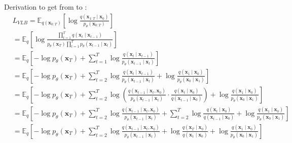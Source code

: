 \noindent Derivation to get from  to :
\begingroup
\small
\begin{subequations}
	\label{eqn:vlb3_appendix}
	\begin{align}
	& L_{VLB}=\mathbb{E}_{q\left(\mathbf{x}_{0: T}\right)}\left[\log \frac{q\left(\mathbf{x}_{1: T} \mid \mathbf{x}_0\right)}{p_\theta\left(\mathbf{x}_{0: T}\right)}\right] \\
	& =\mathbb{E}_q\left[\log \frac{\prod_{t=1}^T q\left(\mathbf{x}_t \mid \mathbf{x}_{t-1}\right)}{p_\theta\left(\mathbf{x}_T\right) \prod_{t=1}^T p_\theta\left(\mathbf{x}_{t-1} \mid \mathbf{x}_t\right)}\right] \\
	& =\mathbb{E}_q\left[-\log p_\theta\left(\mathbf{x}_T\right)+\sum_{t=1}^T \log \frac{q\left(\mathbf{x}_t \mid \mathbf{x}_{t-1}\right)}{p_\theta\left(\mathbf{x}_{t-1} \mid \mathbf{x}_t\right)}\right] \\
	& =\mathbb{E}_q\left[-\log p_\theta\left(\mathbf{x}_T\right)+\sum_{t=2}^T \log \frac{q\left(\mathbf{x}_t \mid \mathbf{x}_{t-1}\right)}{p_\theta\left(\mathbf{x}_{t-1} \mid \mathbf{x}_t\right)}+\log \frac{q\left(\mathbf{x}_1 \mid \mathbf{x}_0\right)}{p_\theta\left(\mathbf{x}_0 \mid \mathbf{x}_1\right)}\right] \\
	& =\mathbb{E}_q\left[-\log p_\theta\left(\mathbf{x}_T\right)+\sum_{t=2}^T \log \left(\frac{q\left(\mathbf{x}_{t-1} \mid \mathbf{x}_t, \mathbf{x}_0\right)}{p_\theta\left(\mathbf{x}_{t-1} \mid \mathbf{x}_t\right)} \cdot \frac{q\left(\mathbf{x}_t \mid \mathbf{x}_0\right)}{q\left(\mathbf{x}_{t-1} \mid \mathbf{x}_0\right)}\right)+\log \frac{q\left(\mathbf{x}_1 \mid \mathbf{x}_0\right)}{p_\theta\left(\mathbf{x}_0 \mid \mathbf{x}_1\right)}\right] \\
	& =\mathbb{E}_q\left[-\log p_\theta\left(\mathbf{x}_T\right)+\sum_{t=2}^T \log \frac{q\left(\mathbf{x}_{t-1} \mid \mathbf{x}_t, \mathbf{x}_0\right)}{p_\theta\left(\mathbf{x}_{t-1} \mid \mathbf{x}_t\right)}+\sum_{t=2}^T \log \frac{q\left(\mathbf{x}_t \mid \mathbf{x}_0\right)}{q\left(\mathbf{x}_{t-1} \mid \mathbf{x}_0\right)}+\log \frac{q\left(\mathbf{x}_1 \mid \mathbf{x}_0\right)}{p_\theta\left(\mathbf{x}_0 \mid \mathbf{x}_1\right)}\right] \\
	& =\mathbb{E}_q\left[-\log p_\theta\left(\mathbf{x}_T\right)+\sum_{t=2}^T \log \frac{q\left(\mathbf{x}_{t-1} \mid \mathbf{x}_t, \mathbf{x}_0\right)}{p_\theta\left(\mathbf{x}_{t-1} \mid \mathbf{x}_t\right)}+\log \frac{q\left(\mathbf{x}_T \mid \mathbf{x}_0\right)}{q\left(\mathbf{x}_1 \mid \mathbf{x}_0\right)}+\log \frac{q\left(\mathbf{x}_1 \mid \mathbf{x}_0\right)}{p_\theta\left(\mathbf{x}_0 \mid \mathbf{x}_1\right)}\right] \\

\end{align}
\end{subequations}
